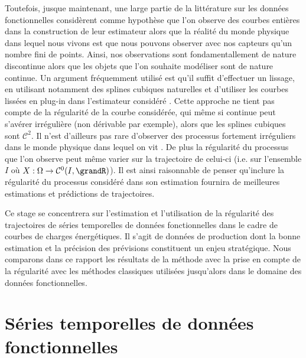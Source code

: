 \pagebreak

Toutefois, jusque maintenant, une large partie de la littérature sur les données fonctionnelles considèrent comme hypothèse que l'on observe des courbes entières dans la construction de leur estimateur alors que la réalité du monde physique dans lequel nous vivons est que nous pouvons observer avec nos capteurs qu'un nombre fini de points. Ainsi, nos observations sont fondamentallement de nature discontinue alors que les objets que l'on souhaite modéliser sont de nature continue. Un argument fréquemment utilisé est qu'il suffit d'effectuer un lissage, en utilisant notamment des splines cubiques naturelles et d'utiliser les courbes lissées en plug-in dans l'estimateur considéré \citationrequise . 
Cette approche ne tient pas compte de la régularité de la courbe considérée, qui même si continue peut s'avérer irrégulière (non dérivable par exemple), alors que les splines cubiques sont $\mathcal C^2$. Il n'est d'ailleurs pas rare d'observer des processus fortement irréguliers dans le monde physique dans lequel on vit \exemplerequis. 
De plus la régularité du processus que l'on observe peut même varier sur la trajectoire de celui-ci (i.e. sur l'ensemble $I$ où $X : \Omega \rightarrow \mathcal C^0(I, \grandR)$). Il est ainsi raisonnable de penser qu'inclure la régularité du processus considéré dans son estimation fournira de meilleures estimations et prédictions de trajectoires. 

\bigskip

Ce stage se concentrera sur l'estimation et l'utilisation de la régularité des trajectoires de séries temporelles de données fonctionnelles dans le cadre de courbes de charges énergétiques. Il s'agit de données de production dont la bonne estimation et la précision des prévisions constituent un enjeu stratégique. Nous comparons dans ce rapport les résultats de la méthode avec la prise en compte de la régularité avec les méthodes classiques utilisées jusqu'alors dans le domaine des données fonctionnelles.

\section{Séries temporelles de données fonctionnelles}